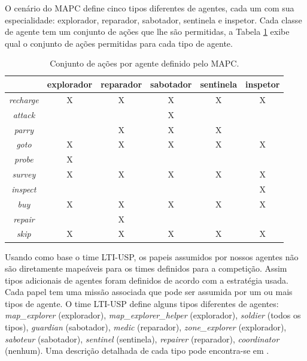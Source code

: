 \documentclass{llncs}
\begin{document}
O cenário do MAPC define cinco tipos diferentes de agentes, cada um com sua especialidade: explorador, reparador, sabotador, sentinela e inspetor. Cada classe de agente tem um conjunto de ações que lhe são permitidas, a Tabela \ref{table:tab1} exibe qual o conjunto de ações permitidas para cada tipo de agente.

\begin{table}[h]
\centering
\begin{tabular}{|c|c|c|c|c|c|}
	\hline
	         & explorador & reparador & sabotador & sentinela & inspetor \\ \hline
	\textit{recharge} &      X      &     X      &     X      &    X       & X \\ \hline
  \textit{attack}  &            &           &     X      &           &  \\ \hline
  \textit{parry}   &            &     X      &    X       &    X       &  \\ \hline
  \textit{goto}   &     X       &     X      &   X        &    X       & X  \\ \hline
  \textit{probe}   &     X       &           &           &           &  \\ \hline
  \textit{survey}  &      X      &     X      &    X       &    X       & X \\ \hline
  \textit{inspect}  &            &           &           &           &  X\\ \hline
  \textit{buy}    &     X       &     X      &     X      &   X        & X \\ \hline
  \textit{repair}  &            &      X     &           &           &  \\ \hline
  \textit{skip}   &    X        &     X      &    X       &   X        & X \\ \hline
\end{tabular}
\caption{Conjunto de ações por agente definido pelo MAPC.}
\label{table:tab1}
\end{table}

Usando como base o time LTI-USP, os papeis assumidos por nossos agentes não são diretamente mapeáveis para os times definidos para a competição. Assim tipos adicionais de agentes foram definidos de acordo com a estratégia usada. Cada papel tem uma missão associada que pode ser assumida por um ou mais tipos de agente. O time LTI-USP define alguns tipos diferentes de agentes: \textit{map\_explorer} (explorador), \textit{map\_explorer\_helper} (explorador), \textit{soldier} (todos os tipos), \textit{guardian} (sabotador), \textit{medic} (reparador), \textit{zone\_explorer} (explorador), \textit{saboteur} (sabotador), \textit{sentinel} (sentinela), \textit{repairer} (reparador), \textit{coordinator} (nenhum). Uma descrição detalhada de cada tipo pode encontra-se em \cite{franco2013improving}.
\end{document}

